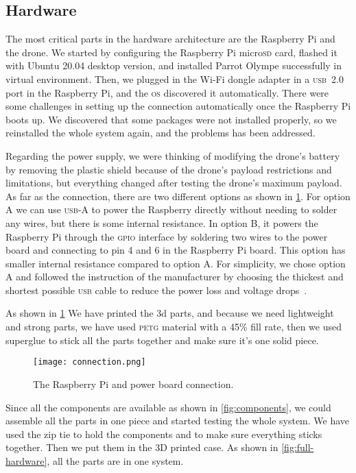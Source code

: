 \documentclass[../main.tex]{subfiles}
\begin{document}
\subsection{Hardware}

The most critical parts in the hardware
architecture are the Raspberry Pi and the drone. 
We started by configuring the Raspberry Pi micro\textsc{sd} card,
flashed it with Ubuntu 20.04 desktop version,
and installed Parrot Olympe successfully in virtual environment. 
Then, we plugged in the Wi-Fi dongle adapter
in a \textsc{usb}~2.0 port in the Raspberry Pi, 
and the \textsc{os} discovered it automatically. 
There were some challenges in setting up the connection automatically 
once the Raspberry Pi boots up. We discovered that some packages were not installed properly,
so we reinstalled the whole system again, and the problems has been addressed. 

Regarding the power supply, we were thinking 
of modifying the drone's battery by removing the 
plastic shield because of the drone's payload restrictions 
and limitations, but everything changed after testing 
the drone's maximum payload.
As far as the connection, there are 
two different options as shown in \cref{fig:connection}.
For option A we can use \textsc{usb}-A to power the Raspberry directly 
without needing to solder any wires, but there is some internal resistance.
In option B, it powers the Raspberry Pi through the \textsc{gpio} 
interface by soldering two wires to the power board and 
connecting to pin 4 and 6 in the Raspberry Pi board.
This option has smaller internal resistance compared to option A.
For simplicity, we chose option A and   
followed the instruction of the manufacturer by choosing 
the thickest and shortest possible \textsc{usb} cable to reduce 
the power loss and voltage drops~\cite{makerfocus}.

As shown in \cref{fig:connection} We have printed the 3d 
parts, and because we need lightweight and strong parts, 
we have used \textsc{petg} material with a 45\% fill rate, 
then we used superglue to stick all the parts together 
and make sure it's one solid piece.

\begin{figure}[tbp]
	\centering
	\texttt{[image: connection.png]}
	\caption{The Raspberry Pi and power board connection.}
	\label{fig:connection}
\end{figure}  

Since all the components are available as shown 
in \cref{fig:components}, we could assemble 
all the parts in one piece and started testing the whole system.
We have used the zip tie to hold the components and to
make sure everything sticks together. Then we put them in the 3D
printed case. As shown in 
\cref{fig:full-hardware}, all the parts are in one system. 
\end{document}
